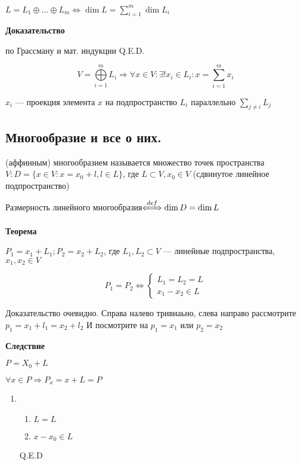 \(L = L_1 \oplus \ldots \oplus L_m \Leftrightarrow \dim L = \sum\limits_{i = 1}^{m} \dim L_i\)

\textbf{Доказательство}

по Грассману и мат. индукции
\hfill Q.E.D.

\[
    V = \bigoplus\limits_{i = 1}^{m} L_i \Rightarrow \forall x \in V: \exists! x_i \in L_i: x = \sum\limits_{i = 1}^{m} x_i
\]

\(x_i\) --- проекция элемента \(x\) на подпространство \(L_i\) параллельно \(\sum\limits_{j \neq i} L_j\)


\subsection{Многообразие и все о них.}
 (аффинным) многообразием называется множество точек пространства \(V: D = \{x \in V: x = x_0 + l, l \in L\}\), где \(L \subset V, x_0 \in V\) (сдвинутое линейное подпространство)

Размерность линейного многообразия\(\defLeftrightarrow \dim D = \dim L\)

\textbf{Теорема}

\(P_1 = x_1 + L_1; P_2 = x_2 + L_2\), где \(L_1, L_2 \subset V\) --- линейные подпространства, \(x_1, x_2 \in V\)

\[
    P_1 = P_2 \Leftrightarrow
    \begin{cases*}
        L_1 = L_2 = L \\
        x_1 - x_2 \in L
    \end{cases*}
\]

Доказательство очевидно. Справа налево тривиаьно, слева направо рассмотрите $p_1 = x_1 +l_1 = x_2 + l_2$ И посмотрите на $p_1=x_1$ или $p_2=x_2$

\textbf{Следствие}

\(P = X_0 + L\)

\(\forall x \in P \Rightarrow P_x = x + L = P\)

\begin{enumerate}
    \item[] \prooff{} \begin{enumerate}
    \item \(L = L\)

    \item \(x - x_0 \in L\)
\end{enumerate}

\hfill Q.E.D
\end{enumerate}


